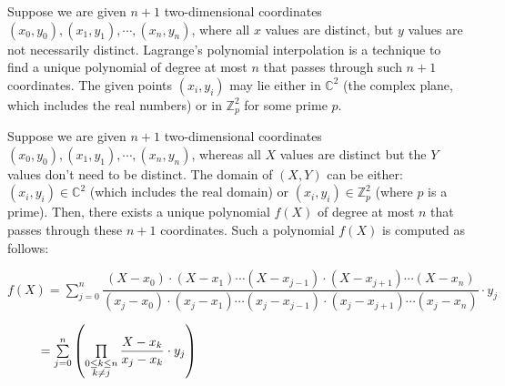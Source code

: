 Suppose we are given $n+1$ two-dimensional coordinates $(x_0, y_0), (x_1, y_1), \cdots, (x_n, y_n)$, where all $x$ values are distinct, but $y$ values are not necessarily distinct. Lagrange's polynomial interpolation is a technique to find a unique polynomial of degree at most $n$ that passes through such $n+1$ coordinates. The given points $(x_i,y_i)$ may lie either in $\mathbb{C}^2$ (the complex plane, which includes the real numbers) or in $\mathbb{Z}_p^2$ for some prime $p$.


\begin{tcolorbox}[title={\textbf{\tboxtheorem{\ref*{sec:polynomial-interpolation}} Lagrange's Polynomial Interpolation}}]

Suppose we are given $n+1$ two-dimensional coordinates $(x_0, y_0), (x_1, y_1), \cdots, (x_n, y_n)$, whereas all $X$ values are distinct but the $Y$ values don't need to be distinct. The domain of $(X, Y)$ can be either: $(x_i, y_i) \in \mathbb{C}^2$ (which includes the real domain) or $(x_i, y_i) \in \mathbb{Z}_p^2$ (where $p$ is a prime). Then, there exists a unique polynomial $f(X)$ of degree at most $n$ that passes through these $n+1$ coordinates. Such a polynomial $f(X)$ is computed as follows:

$f(X) = \sum\limits_{j=0}^{n}\dfrac{(X-x_0)\cdot(X-x_1)\cdots(X-x_{j-1})\cdot(X-x_{j+1})\cdots(X-x_{n})}{(x_j-x_0)\cdot(x_j-x_1)\cdots(x_j-x_{j-1})\cdot(x_j-x_{j+1})\cdots(x_j-x_{n})}\cdot y_j$

$\textcolor{white}{f(X) }= \sum\limits_{j=0}^{n} \left( \prod\limits_{\substack{0 \le k \le n\\ k \ne j}} \dfrac{X - x_k}{x_j - x_k} \cdot y_j\right)$

\end{tcolorbox}

